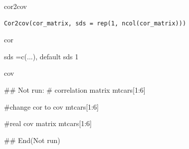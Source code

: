 \documentclass[a4paper]{book}
\begin{document}
%
\begin{Description}
cor2cov
\end{Description}
%
\begin{Usage}
\begin{verbatim}
Cor2cov(cor_matrix, sds = rep(1, ncol(cor_matrix)))
\end{verbatim}
\end{Usage}
%
\begin{Arguments}
\begin{ldescription}
\item[\code{cor\_matrix}] cor

\item[\code{sds}] sds =c(...), default sds 1
\end{ldescription}
\end{Arguments}
%
\begin{Value}
cov
\end{Value}
%
\begin{Examples}
\begin{ExampleCode}

\#\# Not run: 
# correlation matrix
mtcars[1:6] %

#change cor to cov
mtcars[1:6] %

#real cov matrix
mtcars[1:6] %


## End(Not run)


\end{ExampleCode}
\end{Examples}
\end{document}
